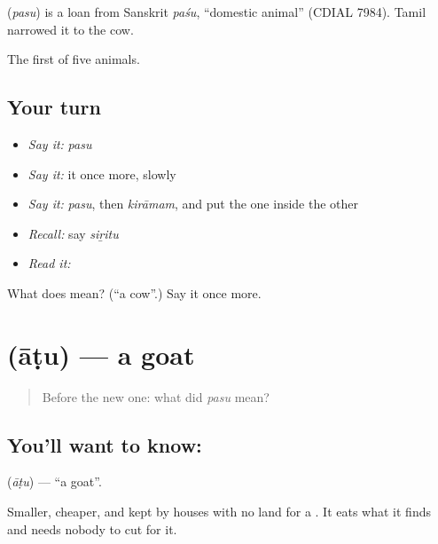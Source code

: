 \begin{cousinweb}
\textbf{} (\emph{pasu}) is a loan from Sanskrit \emph{paśu}, \textquotedblleft{}domestic animal\textquotedblright{} (CDIAL 7984). Tamil narrowed it to the cow.
\end{cousinweb}

\begin{grammarlens}[title={What you've built}]
The first of five animals.
\end{grammarlens}

\subsection*{Your turn}
\begin{itemize}
\raggedright
  \item \emph{Say it:} \emph{pasu}
  \item \emph{Say it:} it once more, slowly
  \item \emph{Say it:} \emph{pasu}, then \emph{kirāmam}, and put the one inside the other
  \item \emph{Recall:} say \emph{siṟitu}
  \item \emph{Read it:} \textbf{}
\end{itemize}

\begin{tcolorbox}[breakable,colback=teal!4,colframe=teal!35!black,title={Before you move on}]
What does  mean? (\textquotedblleft{}a cow\textquotedblright{}.) Say it once more.
\end{tcolorbox}
\section[\texorpdfstring{\ta{ஆடு} (āṭu)}{ஆடு (āṭu)}]{ (āṭu) — a goat}

\label{lesson:TA-C58-goat}



\begin{quote}
Before the new one: what did \emph{pasu} mean?
\end{quote}

\subsection*{You'll want to know: }
\textbf{} (\emph{āṭu}) — \textquotedblleft{}a goat\textquotedblright{}.

Smaller, cheaper, and kept by houses with no land for a . It eats what it finds and needs nobody to cut for it.

